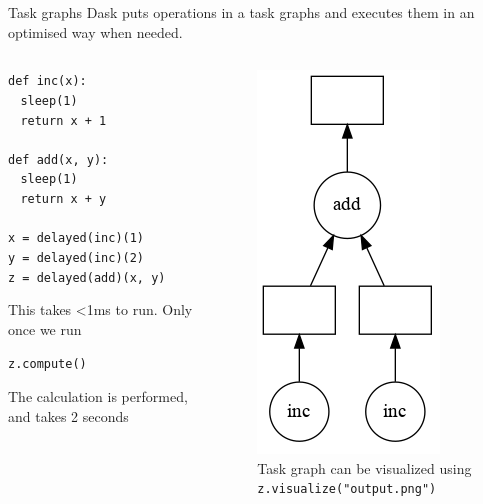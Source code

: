 \documentclass[9pt, aspectratio=169]{beamer}
\begin{document}
\begin{frame}
	{Task graphs}
	Dask puts operations in a task graphs and executes them in an optimised way when needed.
	\begin{columns}
		\begin{column}{.6\textwidth}
			\begin{codebox}
				\texttt{def inc(x):\\
					$~~~~$sleep(1)\\
					$~~~~$return x + 1\\
					\\
					def add(x, y):\\
					$~~~~$sleep(1)\\
					$~~~~$return x + y\\
					\\
					x = delayed(inc)(1)\\
					y = delayed(inc)(2)\\
					z = delayed(add)(x, y)}
			\end{codebox}
			\pause
			This takes <1ms to run. Only once we run
			\begin{codebox}
				\texttt{z.compute()}
			\end{codebox}
			The calculation is performed, and takes 2 seconds
		\end{column}
		\begin{column}{.4\textwidth}
			\begin{figure}
				\pause
				\centering
				\includegraphics[width=.4\textwidth]{DAG.png}
				\caption{\centering Task graph can be visualized using \texttt{z.visualize("output.png")}}
			\end{figure}
		\end{column}
	\end{columns}
\end{frame}
\end{document}
